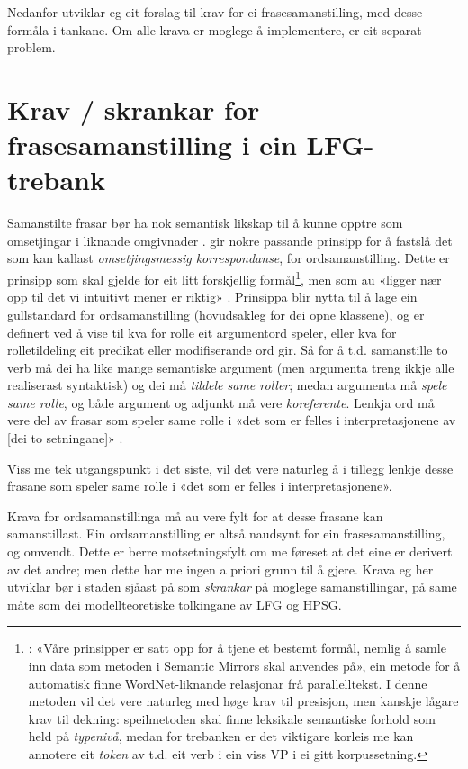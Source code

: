 \documentclass[11pt,a4paper,oneside,draft]{book}
\begin{document}
Nedanfor utviklar eg eit forslag til krav for ei frasesamanstilling,
med desse formåla i tankane. Om alle krava er moglege å implementere,
er eit separat problem.

\section{Krav / skrankar for frasesamanstilling i ein LFG-trebank}
\label{sec-3.4}


Samanstilte frasar bør ha nok semantisk likskap til å kunne opptre som
omsetjingar i liknande omgivnader
\citep[s.~74]{dyvik2009lmp}. \citet{thunes2003eal} gir nokre passande prinsipp
for å fastslå det som kan kallast \emph{omsetjingsmessig korrespondanse}, for
ordsamanstilling. Dette er prinsipp som skal gjelde for eit litt forskjellig
formål\footnote{\cite[s.~2]{thunes2003eal}: «Våre prinsipper er satt
opp for å tjene et bestemt formål, nemlig å samle inn data som metoden
i Semantic Mirrors skal anvendes på», ein metode for å automatisk
finne WordNet-liknande relasjonar frå parallelltekst. I denne metoden
vil det vere naturleg med høge krav til presisjon, men kanskje lågare
krav til dekning: speilmetoden skal finne leksikale semantiske forhold
som held på \emph{typenivå}, medan for trebanken er det viktigare korleis
me kan annotere eit \emph{token} av t.d. eit verb i ein viss VP i ei gitt
korpussetning. }, men som au «ligger nær opp til det vi intuitivt
mener er riktig» \citep[s.~2]{thunes2003eal}. Prinsippa blir nytta til
å lage ein gullstandard for ordsamanstilling (hovudsakleg for dei opne
klassene), og er definert ved å vise til kva for rolle eit argumentord
speler, eller kva for rolletildeling eit predikat eller modifiserande
ord gir. Så for å t.d. samanstille to verb må dei ha like mange
semantiske argument (men argumenta treng ikkje alle realiserast
syntaktisk) og dei må \emph{tildele same roller}; medan argumenta må \emph{spele same rolle}, og både argument og adjunkt må vere \emph{koreferente}. Lenkja
ord må vere del av frasar som speler same rolle i «det som er felles i
interpretasjonene av [dei to setningane]» \citep[s.~3]{thunes2003eal}.

Viss me tek utgangspunkt i det siste, vil det vere naturleg å i
tillegg lenkje desse frasane som speler same rolle i «det som er
felles i interpretasjonene».

Krava for ordsamanstillinga må au vere fylt for at desse frasane kan
samanstillast. Ein ordsamanstilling er altså naudsynt for ein
frasesamanstilling, og omvendt. Dette er berre motsetningsfylt om me
føreset at det eine er derivert av det andre; men dette har me ingen a
priori grunn til å gjere. Krava eg her utviklar bør i staden sjåast på
som \emph{skrankar} på moglege samanstillingar, på same måte som dei
modellteoretiske tolkingane av LFG og HPSG.
\end{document}
